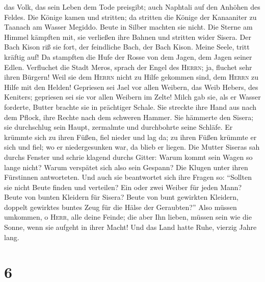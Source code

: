 das Volk, das sein Leben dem Tode preisgibt; auch Naphtali auf den
Anhöhen des Feldes.  Die Könige kamen und stritten; da
stritten die Könige der Kanaaniter zu Taanach am Wasser Megiddo. Beute
in Silber machten sie nicht.  Die Sterne am Himmel
kämpften mit, sie verließen ihre Bahnen und stritten wider Sisera.
 Der Bach Kison riß sie fort, der feindliche Bach, der
Bach Kison. Meine Seele, tritt kräftig auf!  Da stampften
die Hufe der Rosse von dem Jagen, dem Jagen seiner Edlen.
 Verfluchet die Stadt Meros, sprach der Engel des
\textsc{Herrn}; ja, fluchet sehr ihren Bürgern! Weil sie dem
\textsc{Herrn} nicht zu Hilfe gekommen sind, dem \textsc{Herrn} zu Hilfe
mit den Helden!  Gepriesen sei Jael vor allen Weibern,
das Weib Hebers, des Keniters; gepriesen sei sie vor allen Weibern im
Zelte!  Milch gab sie, als er Wasser forderte, Butter
brachte sie in prächtiger Schale.  Sie streckte ihre Hand
aus nach dem Pflock, ihre Rechte nach dem schweren Hammer. Sie hämmerte
den Sisera; sie durchschlug sein Haupt, zermalmte und durchbohrte seine
Schläfe.  Er krümmte sich zu ihren Füßen, fiel nieder und
lag da; zu ihren Füßen krümmte er sich und fiel; wo er niedergesunken
war, da blieb er liegen.  Die Mutter Siseras sah durchs
Fenster und schrie klagend durchs Gitter: Warum kommt sein Wagen so
lange nicht? Warum verspätet sich also sein Gespann?  Die
Klugen unter ihren Fürstinnen antworteten. Und auch sie beantwortet sich
ihre Fragen so:  ``Sollten sie nicht Beute finden und
verteilen? Ein oder zwei Weiber für jeden Mann? Beute von bunten
Kleidern für Sisera? Beute von bunt gewirkten Kleidern, doppelt
gewirktes buntes Zeug für die Hälse der Geraubten?'' 
Also müssen umkommen, o \textsc{Herr}, alle deine Feinde; die aber Ihn
lieben, müssen sein wie die Sonne, wenn sie aufgeht in ihrer Macht! Und
das Land hatte Ruhe, vierzig Jahre lang.

\hypertarget{section-5}{%
\section{6}\label{section-5}}

